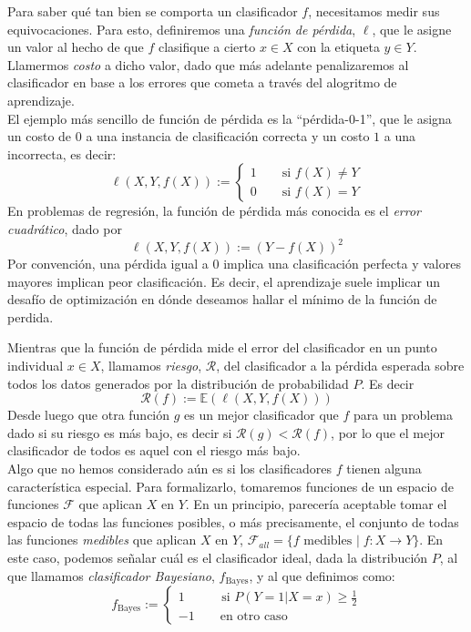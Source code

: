 \documentclass{article}
\begin{document}
Para saber qué tan bien se comporta un clasificador $f$, necesitamos medir sus equivocaciones. Para esto, definiremos una \textit{función de pérdida},
$\ell$, que le asigne un valor al hecho de que $f$ clasifique a cierto $x\in X$ con la etiqueta $y\in Y$. Llamermos \textit{costo} a dicho valor, 
dado que más adelante penalizaremos al clasificador en base a los errores que cometa a través del alogritmo de aprendizaje.\\
El ejemplo más sencillo de función de pérdida es la ``pérdida-0-1'', que le asigna un costo de $0$ a una instancia de clasificación correcta y un costo
$1$ a una incorrecta, es decir:
$$
\ell(X,Y,f(X)):= \begin{cases}
    1 \qquad \text{si } f(X) \neq Y \\
    0 \qquad \text{si } f(X) = Y
\end{cases}
$$
En problemas de regresión, la función de pérdida más conocida es el \textit{error cuadrático}, dado por
$$
\ell(X,Y,f(X)):= (Y-f(X))^2
$$
Por convención, una pérdida igual a $0$ implica una clasificación perfecta y valores mayores implican peor clasificación. Es decir,
el aprendizaje suele implicar un desafío de optimización en dónde deseamos hallar el mínimo de la función de perdida.

Mientras que la función de pérdida mide el error del clasificador en un punto individual $x\in X$, llamamos \textit{riesgo}, $\mathcal{R}$, 
del clasificador a la pérdida esperada sobre todos los datos generados por la distribución de probabilidad $P$. Es decir
$$
\mathcal{R}(f) := \mathbb{E}\left( \ell(X,Y,f(X)) \right)
$$
Desde luego que otra función $g$ es un mejor clasificador que $f$ para un problema dado si su riesgo es más bajo, es decir si $\mathcal{R}(g)
< \mathcal{R}(f)$, por lo que el mejor clasificador de todos es aquel con el riesgo más bajo.\\

Algo que no hemos considerado aún es si los clasificadores $f$ tienen alguna característica especial. Para formalizarlo, tomaremos funciones de un
espacio de funciones $\mathcal{F}$ que aplican $X$ en $Y$. En un principio, parecería aceptable tomar el espacio de todas las funciones posibles, o 
más precisamente, el conjunto de todas las funciones \textit{medibles} que aplican $X$ en $Y$, $\mathcal{F}_{all} = \{f \text{ medibles  } | 
\; f: X \rightarrow Y \}$. En este caso, podemos señalar cuál es el clasificador ideal, dada la distribución $P$, al que llamamos
\textit{clasificador Bayesiano}, $f_{\text{Bayes}}$, y al que definimos como:
$$
f_{\text{Bayes}} := \begin{cases}
1 \qquad \; \; \text{  si } P(Y=1 | X=x) \geq \frac{1}{2}\\
-1 \qquad \text{en otro caso }
\end{cases}
$$
\end{document}
